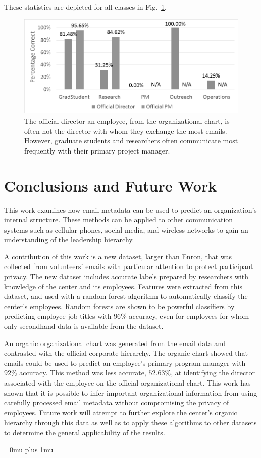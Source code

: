 \documentclass[10pt,twocolumn,conference]{IEEEtran}
\begin{document}
These statistics are depicted for all classes in Fig.~\ref{fig:project_analysis}.


\begin{figure}[t]
	\centering
	\includegraphics[width=\columnwidth,trim={1mm 5mm 10mm 2mm},clip]{superior_identification_BW}
    \vspace{-18pt}
	\caption{The official director an employee, from the organizational chart, is often not the director with whom they exchange the most emails.  However, graduate students and researchers often communicate most frequently with their primary project manager.}
	\vspace{-12pt}
	\label{fig:project_analysis}
\end{figure}

\section{Conclusions and Future Work} \label{Conclusions}
This work examines how email metadata can be used to predict an organization's internal structure.
These methods can be applied to other communication systems such as cellular phones, social media, and wireless networks to gain an understanding of the leadership hierarchy.

A contribution of this work is a new dataset, larger than Enron, that was collected from volunteers' emails with particular attention to protect participant privacy.
The new dataset includes accurate labels prepared by researchers with knowledge of the center and its employees.
Features were extracted from this dataset, and used with a random forest algorithm to automatically classify the center's employees.
Random forests are shown to be powerful classifiers by predicting employee job titles with $96\%$ accuracy, even for employees for whom only secondhand data is available from the dataset.

An organic organizational chart was generated from the email data and contrasted with the official corporate hierarchy.
The organic chart showed that emails could be used to predict an employee's primary program manager with $92\%$ accuracy.
This method was less accurate, $52.63\%$, at identifying the director associated with the employee on the official organizational chart.
This work has shown that it is possible to infer important organizational information from using carefully processed email metadata without compromising the privacy of employees.
Future work will attempt to further explore the center's organic hierarchy through this data as well as to apply these algorithms to other datasets to determine the general applicability of the results.

\Urlmuskip=0mu plus 1mu\relax


\end{document}

